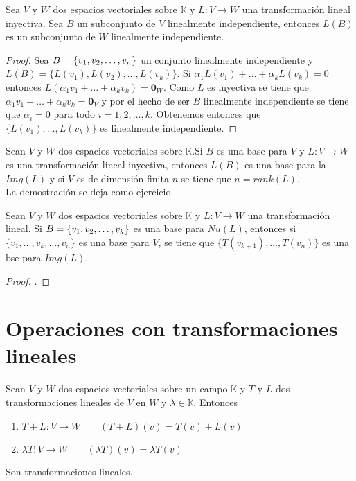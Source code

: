 \begin{theorem}
Sea $V$ y $W$ dos espacios vectoriales sobre $\mathbb{K}$ y $L : V \to W$ una transformación lineal inyectiva. Sea $B$ un subconjunto de $V$ linealmente independiente, entonces $L(B)$ es un subconjunto de $W$ linealmente independiente. 
\end{theorem}

\begin{proof}
Sea $B =  \lbrace v_1, v_2, \ldots, v_n \rbrace$ un conjunto linealmente independiente y $L(B) = \{L(v_1), L(v_2), \ldots , L(v_k)\}$. Si $\alpha_1 L(v_1) + \ldots + \alpha_k L(v_k) = 0$ entonces $L(\alpha_1 v_1 + \ldots +\alpha_k v_k) = \mathbf{0}_W$. Como $L$ es inyectiva se tiene que $\alpha_1 v_1 + \ldots + \alpha_k v_k = \mathbf{0}_V$ y por el hecho de ser $B$ linealmente independiente se tiene que $\alpha_i = 0$ para todo $i = 1, 2, \ldots , k$. Obtenemos entonces que $\{L(v_1), \ldots , L(v_k)\}$ es linealmente independiente.
\end{proof}

\begin{theorem}
Sean $V$ y $W$ dos espacios vectoriales sobre $\mathbb{K}$.Si $B$ es una base para $V$ y $L : V \to W$ es una transformación lineal inyectiva, entonces $L(B)$ es una base para la $Img(L)$ y si $V$ es de dimensión finita $n$ se tiene que $n = rank(L)$.\\

La demostración se deja como ejercicio. %
\end{theorem}

\begin{theorem}
Sean $V$ y $W$ dos espacios vectoriales sobre $\mathbb{K}$ y $L : V \to W$ una transformación lineal. Si $B =  \lbrace v_1, v_2, \ldots, v_k \rbrace$ es una base para $Nu(L)$, entonces si $\{v_1 , \ldots , v_{k}, \ldots , v_n\}$ es una base para $V$, se tiene que $\{T(v_{k+1}), \ldots , T(v_n)\}$ es una bse para $Img(L)$.
\end{theorem}

\begin{proof}
.
\end{proof}

\section{Operaciones con transformaciones lineales}
\begin{dfn}
Sean $V$ y $W$ dos espacios vectoriales sobre un campo $\mathbb{K}$ y $T$ y $L$ dos transformaciones lineales de $V$ en $W$ y $\lambda \in \mathbb{K}$. Entonces 
\begin{enumerate}
\item $T + L : V \to W \qquad (T + L)(v) = T(v) + L(v)$
\item $\lambda T : V \to W \qquad (\lambda T)(v) = \lambda T(v)$
\end{enumerate}
Son transformaciones lineales.
\end{dfn}

